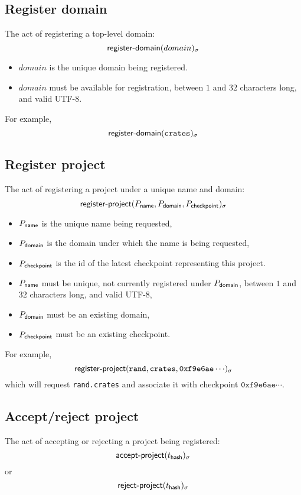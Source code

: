 \subsection{Register domain}
The act of registering a top-level domain:
\[
    \mathsf{register\hbox{-}domain}\lparen domain\rparen_\sigma
\]
\begin{itemize}
    \item $domain$ is the unique domain being registered.
\end{itemize}
\validation
\begin{itemize}
    \item $domain$ must be available for registration, between $1$ and $32$
        characters long, and valid UTF-8.
\end{itemize}
For example,
\[
    \mathsf{register\hbox{-}domain}\lparen\mathtt{crates}\rparen_\sigma
\]

\subsection{Register project}
The act of registering a project under a unique name and domain:
\[
    \mathsf{register\hbox{-}project}\lparen P_{\mathsf{name}}, P_{\mathsf{domain}}, P_{\mathsf{checkpoint}}\rparen_\sigma
\]
\begin{itemize}
    \item $P_{\mathsf{name}}$ is the unique name being requested,
    \item $P_{\mathsf{domain}}$ is the domain under which the name is being requested,
    \item $P_{\mathsf{checkpoint}}$ is the id of the latest checkpoint
        representing this project.
\end{itemize}
\validation
\begin{itemize}
    \item $P_{\mathsf{name}}$ must be unique, \ie not currently registered under
        $P_{\mathsf{domain}}$, between $1$ and $32$ characters long, and valid
        \textsf{UTF-8},
    \item $P_{\mathsf{domain}}$ must be an existing domain,
    \item $P_{\mathsf{checkpoint}}$ must be an existing checkpoint.
\end{itemize}
For example,
\[
    \mathsf{register\hbox{-}project}\lparen\mathtt{rand}, \mathtt{crates}, \mathtt{0xf9e6ae}\cdots\rparen_\sigma
\]
which will request \texttt{rand.crates} and associate it with
checkpoint $\mathtt{0xf9e6ae}\cdots$.

\subsection{Accept/reject project}
The act of accepting or rejecting a project being registered:
\[
    \mathsf{accept\hbox{-}project}\lparen t_{\mathsf{hash}}\rparen_\sigma
\]
or
\[
    \mathsf{reject\hbox{-}project}\lparen t_{\mathsf{hash}}\rparen_\sigma
\]

